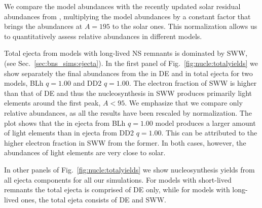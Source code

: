 We compare the model abundances with the recently updated solar residual 
\rproc{} abundances from \citet{Prantzos2020},
%
multiplying the model abundances by a constant factor that brings the abundances 
at $A=195$ to the solar ones. This normalization allows us to quantitatively 
assess relative abundances in different models.

Total ejecta from models with long-lived \ac{NS} remnants is dominated by
\ac{SWW}, %
(see Sec.~\ref{sec:bns_sims:ejecta}). 
%
In the first panel of Fig.~\ref{fig:nucle:totalyields} we show separately the 
final abundances from the \rproc{} in \ac{DE} and in total ejecta  
for two models, BLh $q=1.00$ and DD2 $q=1.00$. 
%
The electron fraction of \ac{SWW} is higher than that of \ac{DE} 
and thus the \rproc{} nucleosynthesis in 
\ac{SWW} produces primarily light elements around the first \rproc{} peak, $A<95$.
We emphasize that we compare only relative abundances, as all the results have 
been rescaled by normalization. 
%
The plot shows that the \rproc{} in ejecta from BLh $q=1.00$ model produces 
a larger amount of light elements than in ejecta from DD2 $q=1.00$.
%
This can be attributed to the higher electron fraction in \ac{SWW} 
from the former. In both cases, however, the abundances of light elements 
are very close to solar. 


In other panels of Fig.~\ref{fig:nucle:totalyields}
we show nucleosynthesis yields from all ejecta components for all our simulations. 
For models with short-lived \pmerg{} remnants the total ejecta is comprised 
of \ac{DE} only, while for models with long-lived ones, the total ejeta 
consists of \ac{DE} and \ac{SWW}. 
%
%
%


